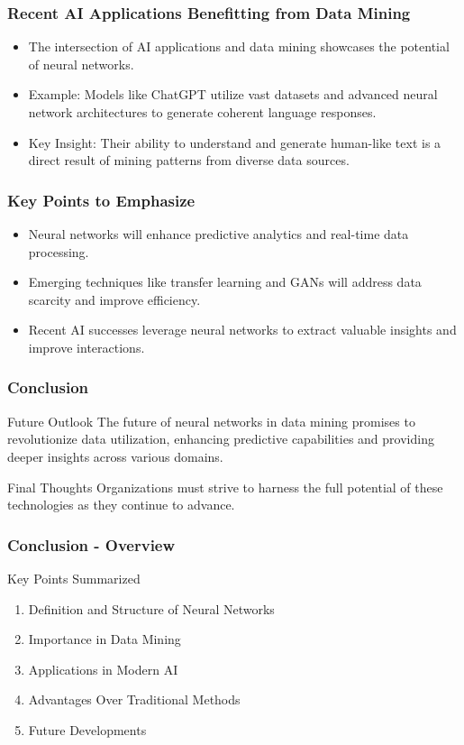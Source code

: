 \documentclass[aspectratio=169]{beamer}
\begin{document}
\begin{frame}[fragile]
    \frametitle{Recent AI Applications Benefitting from Data Mining}
    \begin{itemize}
        \item The intersection of AI applications and data mining showcases the potential of neural networks.
        \item Example: Models like ChatGPT utilize vast datasets and advanced neural network architectures to generate coherent language responses.
        \item Key Insight: Their ability to understand and generate human-like text is a direct result of mining patterns from diverse data sources.
    \end{itemize}
\end{frame}

\begin{frame}[fragile]
    \frametitle{Key Points to Emphasize}
    \begin{itemize}
        \item Neural networks will enhance predictive analytics and real-time data processing.
        \item Emerging techniques like transfer learning and GANs will address data scarcity and improve efficiency.
        \item Recent AI successes leverage neural networks to extract valuable insights and improve interactions.
    \end{itemize}
\end{frame}

\begin{frame}[fragile]
    \frametitle{Conclusion}
    \begin{block}{Future Outlook}
        The future of neural networks in data mining promises to revolutionize data utilization, enhancing predictive capabilities and providing deeper insights across various domains.
    \end{block}
    \begin{block}{Final Thoughts}
        Organizations must strive to harness the full potential of these technologies as they continue to advance.
    \end{block}
\end{frame}

\begin{frame}[fragile]
    \frametitle{Conclusion - Overview}
    \begin{block}{Key Points Summarized}
        \begin{enumerate}
            \item Definition and Structure of Neural Networks
            \item Importance in Data Mining
            \item Applications in Modern AI
            \item Advantages Over Traditional Methods
            \item Future Developments
        \end{enumerate}
    \end{block}
\end{frame}
\end{document}
